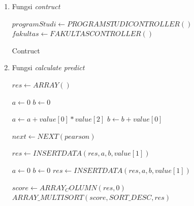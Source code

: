 \begin{enumerate}
    \item Fungsi \textit{contruct}\\
    
        \begin{algorithm}[H]
            \begin{algorithmic}[1]
                    \State $programStudi \gets PROGRAMSTUDICONTROLLER()$
                    \State $fakultas \gets FAKULTASCONTROLLER()$
                \EndProcedure
            \end{algorithmic} 
            \caption{Contruct}
            \label{alg:Contruct prediction}
        \end{algorithm}

    \item Fungsi \textit{calculate predict}\\
        
        \begin{algorithm}[H]
            \begin{algorithmic}[1]
                    \State $res \gets ARRAY()$
                    
                    \State $a \gets 0$ 
                    \State $b \gets 0$ 
                    
                        \State $a \gets a + value[0]*value[2]$
                        \State $b \gets b + value[0]$
                        
                        \State $next \gets NEXT(pearson)$
                        
                                \State $res \gets INSERTDATA(res, a, b, value[1])$
                                
                                \State $a \gets 0$
                                \State $b \gets 0$
                            \EndIf
                            \State $res \gets INSERTDATA(res, a, b, value[1])$
                        \EndIf
                    \EndFor
                    
                    \State $score \gets ARRAY_COLUMN(res,0)$ 
                    \State $ARRAY\_MULTISORT(score, SORT\_DESC, res)$ 
                    

\end{algorithmic}
\end{algorithm}
\end{enumerate}

